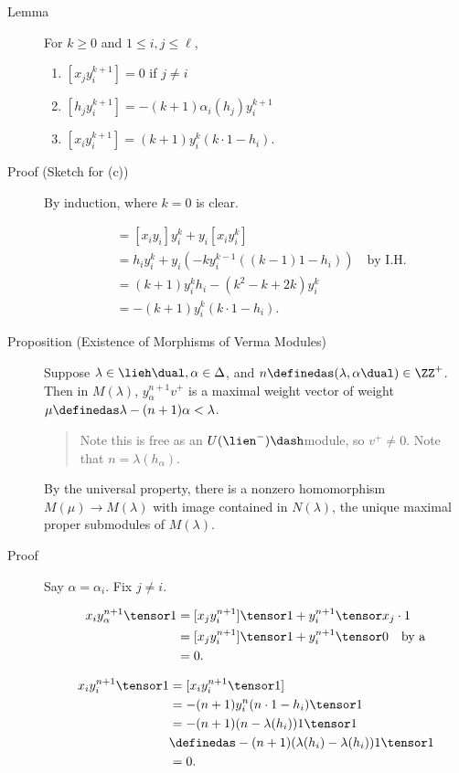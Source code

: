 \begin{description}
\item[Lemma]
For \(k\geq 0\) and \(1 \leq i, j \leq \ell\),

\begin{enumerate}
\def\labelenumi{\alph{enumi}.}
\tightlist
\item
  \([x_j y_i^{k+1}] = 0\) if \(j\neq i\)
\item
  \([h_j y_i^{k+1}] = -(k+1) \alpha_i(h_j) y_i^{k+1}\)
\item
  \([x_i y_i^{k+1}] = (k+1) y_i^{k} (k\cdot 1 - h_i)\).
\end{enumerate}
\item[Proof (Sketch for (c))]
By induction, where \(k=0\) is clear.

\begin{align*}
[x+i y_i^{k+1}]
&= [x_i y_i] y_i^k + y_i [x_i y_i^k] \\
&=h_i y_i^k + y_i(-k y_i^{k-1} ((k-1)1 - h_i)) \quad\text{by I.H.} \\
&= (k+1)y_i^k h_i - (k^2 -k + 2k)y_i^k \\
&= -(k+1) y_i^k ( k\cdot 1 - h_i )
.\end{align*}
\item[Proposition (Existence of Morphisms of Verma Modules)]
Suppose \(\lambda \in \lieh\dual, \alpha \in \Delta\), and
\(n\definedas (\lambda, \alpha\dual) \in \ZZ^+\). Then in
\(M(\lambda)\), \(y_\alpha^{n+1} v^+\) is a maximal weight vector of
weight \(\mu \definedas \lambda - (n+1)\alpha < \lambda\).

\begin{quote}
Note this is free as an \(U(\lien^-)\dash\)module, so \(v^+ \neq 0\).
Note that \(n = \lambda(h_\alpha)\).
\end{quote}

By the universal property, there is a nonzero homomorphism
\(M(\mu) \to M(\lambda)\) with image contained in \(N(\lambda)\), the
unique maximal proper submodules of \(M(\lambda)\).
\item[Proof]
Say \(\alpha = \alpha_i\). Fix \(j\neq i\).

\begin{align*}
x_i y_\alpha^{n+1} \tensor 1 
&= [x_j y_i^{n+1}] \tensor 1 + y_i^{n+1} \tensor x_j \cdot 1 \\
&= [x_j y_i^{n+1}] \tensor 1 + y_i^{n+1} \tensor 0 \quad\text{by a} \\
&= 0
.\end{align*}

\begin{align*}
x_i y_i^{n+1} \tensor 1 
&= [x_i y_i^{n+1} \tensor 1] \\
&= -(n+1) y_i^n (n\cdot 1 - h_i) \tensor 1 \\
&= -(n+1) (n - \lambda(h_i)) 1 \tensor 1 \\
&\definedas -(n+1) (\lambda(h_i) - \lambda(h_i)) 1 \tensor 1 \\
&= 0
.\end{align*}


\end{description}
